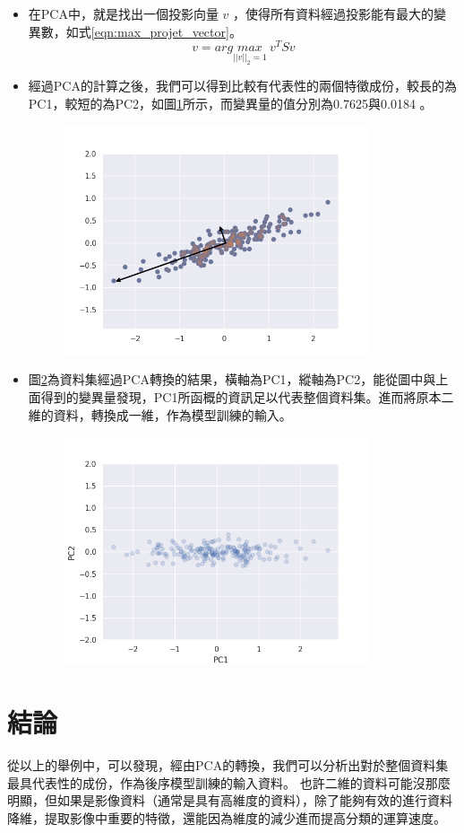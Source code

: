 \begin{itemize}
	\item
		在PCA中，就是找出一個投影向量 \(v\) ，使得所有資料經過投影能有最大的變異數，如式\ref{eqn:max_projet_vector}。
		\begin{equation}
			\label{eqn:max_projet_vector}
			v = arg \underset{||v||_2=1}{max}\  v^TSv			
		\end{equation}


		\newpage
	\item
		經過PCA的計算之後，我們可以得到比較有代表性的兩個特徵成份，較長的為PC1，較短的為PC2，如圖\ref{fig:pc1_and_pc2}所示，而變異量的值分別為0.7625與0.0184 。


	      \begin{figure}[H]
		      \centering
		      \includegraphics[width=9cm]{pic/pca_with_pca_axis.png}
		      \caption{}
		      \label{fig:pc1_and_pc2}
	      \end{figure}


	\item
	圖\ref{fig:pca_transform}為資料集經過PCA轉換的結果，橫軸為PC1，縱軸為PC2，能從圖中與上面得到的變異量發現，PC1所函概的資訊足以代表整個資料集。進而將原本二維的資料，轉換成一維，作為模型訓練的輸⼊。


	      \begin{figure}[H]
		      \centering
		      \includegraphics[width=9cm]{pic/pca_transform.png}
		      \caption{}
		      \label{fig:pca_transform}
	      \end{figure}

\end{itemize}


\section {結論}
從以上的舉例中，可以發現，經由PCA的轉換，我們可以分析出對於整個資料集最具代表性的成份，作為後序模型訓練的輸⼊資料。
也許二維的資料可能沒那麼明顯，但如果是影像資料（通常是具有高維度的資料），除了能夠有效的進行資料降維，提取影像中重要的特徵，還能因為維度的減少進而提高分類的運算速度。


